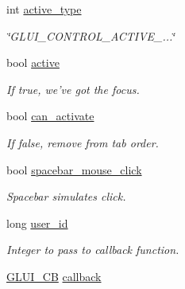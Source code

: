 \begin{DoxyCompactItemize}
\item 
int \hyperlink{classGLUI__Control_ab9864db034526ddd5bbff94a5fb3ee9b}{active\-\_\-type}
\begin{DoxyCompactList}\small\item\em \char`\"{}\-G\-L\-U\-I\-\_\-\-C\-O\-N\-T\-R\-O\-L\-\_\-\-A\-C\-T\-I\-V\-E\-\_\-...\char`\"{} \end{DoxyCompactList}\item 
\hypertarget{classGLUI__Control_ad285387e771b46fb294935f68e967a77}{bool \hyperlink{classGLUI__Control_ad285387e771b46fb294935f68e967a77}{active}}\label{classGLUI__Control_ad285387e771b46fb294935f68e967a77}

\begin{DoxyCompactList}\small\item\em If true, we've got the focus. \end{DoxyCompactList}\item 
\hypertarget{classGLUI__Control_a2484b0899bd5b56673a73387c9c530a7}{bool \hyperlink{classGLUI__Control_a2484b0899bd5b56673a73387c9c530a7}{can\-\_\-activate}}\label{classGLUI__Control_a2484b0899bd5b56673a73387c9c530a7}

\begin{DoxyCompactList}\small\item\em If false, remove from tab order. \end{DoxyCompactList}\item 
\hypertarget{classGLUI__Control_a023da130fb762f944077c55d90aec839}{bool \hyperlink{classGLUI__Control_a023da130fb762f944077c55d90aec839}{spacebar\-\_\-mouse\-\_\-click}}\label{classGLUI__Control_a023da130fb762f944077c55d90aec839}

\begin{DoxyCompactList}\small\item\em Spacebar simulates click. \end{DoxyCompactList}\item 
long \hyperlink{classGLUI__Control_a6c88b7c72b0800f88a5d4cda4868c8b6}{user\-\_\-id}
\begin{DoxyCompactList}\small\item\em Integer to pass to callback function. \end{DoxyCompactList}\item 
\hypertarget{classGLUI__Control_a96060fe0cc6d537e736dd6eef78e24ab}{\hyperlink{classGLUI__CB}{G\-L\-U\-I\-\_\-\-C\-B} \hyperlink{classGLUI__Control_a96060fe0cc6d537e736dd6eef78e24ab}{callback}}\label{classGLUI__Control_a96060fe0cc6d537e736dd6eef78e24ab}


\end{DoxyCompactItemize}
